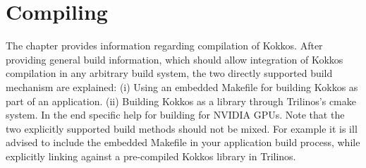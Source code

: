 
\chapter{Compiling}
The chapter provides information regarding compilation of Kokkos. 
After providing general build information, which should allow integration of Kokkos compilation in any arbitrary build system, the two directly supported build mechanism are explained:
(i) Using an embedded Makefile for building Kokkos as part of an application.
(ii) Building Kokkos as a library through Trilinos's cmake system.
In the end specific help for building for NVIDIA GPUs.
Note that the two explicitly supported build methods should not be mixed. 
For example it is ill advised to include the embedded Makefile in your application build process, while explicitly linking against a pre-compiled Kokkos library in Trilinos.

